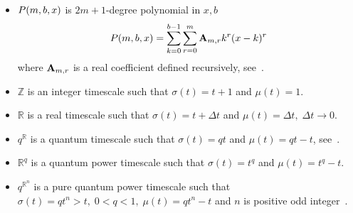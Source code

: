 \begin{itemize}
    \item $P ( m, b, x )$ is $2m+1$-degree polynomial in $x,b$
    \begin{equation}
        P ( m, b, x ) = \sum_{k=0}^{b-1} \sum_{r=0}^{m} {\mathbf{A}} \sb{m,r} k^r(x-k)^r
        \label{eq:polynomial_p}
    \end{equation}
    where ${\mathbf{A}} \sb{m,r}$ is a real coefficient defined recursively, see~\cite{kolosov2016link}.

    \item $\mathbb{Z}$ is an integer timescale such that $\sigma(t) = t+1$ and $\mu(t) = 1$.

    \item $\mathbb{R}$ is a real timescale such that $\sigma(t) = t+\Delta t$ and $\mu(t) = \Delta t, \; \Delta t \to 0$.

    \item $q^\mathbb{R}$ is a quantum timescale such that $\sigma(t) = qt$ and $\mu(t) = qt - t$,
    see~\cite[p. 18]{Bohner2001DynamicEO}.

    \item $\mathbb{R}^q$ is a quantum power timescale such that $\sigma(t) = t^q$ and $\mu(t) = t^q - t$.

    \item $q^{\mathbb{R}^n}$ is a pure quantum power timescale
    such that $\sigma(t) = qt^n > t, \; 0<q<1, \; \mu(t) = qt^n - t$ and $n$ is positive
    odd integer~\cite{aldwoah2011power}.
\end{itemize}
